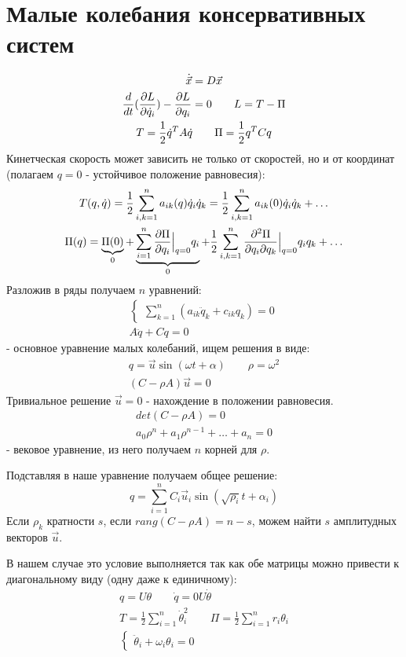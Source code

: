 \documentclass{article}
\begin{document}
\section{Малые колебания консервативных систем}
\begin{gather*}
  \dot{\vec{x}}=D\vec{x} \\ 
  \frac{d}{dt}(\frac{\partial{L}}{\partial{\dot{q}_i}})-\frac{\partial{L}}{\partial{q_i}}=0 \qquad L = T-\Pi \\ 
  T=\frac{1}{2}\dot{q}^{T}A\dot{q} \qquad \Pi=\frac{1}{2}q^{T}Cq
\end{gather*}
Кинетческая скорость может зависить не только от скоростей, но и от координат 
(полагаем $q=0$ - устойчивое положение равновесия):
\begin{gather*}
  T(q, \dot{q})=\frac{1}{2}\sum_{i,k=1}^{n}a_{ik}(q)\dot{q}_i\dot{q}_k
  = \frac{1}{2}\sum_{i,k=1}^{n}a_{ik}(0)\dot{q}_i\dot{q}_k + \dots \\ 
  \Pi(q) = \underbrace{\Pi(0)}_{0} + \underbrace{\sum_{i=1}^{n}\frac{\partial{\Pi}}{\partial{q_i}}\Big|_{q=0} q_i}_{0}
  + \frac{1}{2}\sum_{i,k=1}^{n}\frac{\partial^{2}\Pi}{\partial q_i \partial q_k}\Big|_{q=0} q_iq_k + \dots 
\end{gather*}
Разложив в ряды получаем $n$ уравнений:
\begin{gather*}
  \left\{\begin{aligned}
    \sum_{k=1}^{n}(a_{ik}\ddot q_k + c_{ik}q_k)=0
  \end{aligned}\right. \\ 
  A\ddot q + Cq=0
\end{gather*}
- основное уравнение малых колебаний, ищем решения в виде:
\begin{gather*}
  q=\vec{u}\sin (\omega t + \alpha) \qquad \rho=\omega^{2} \\ 
  (C-\rho A)\vec{u}=0
\end{gather*}
Тривиальное решение $\vec{u}=0$ - нахождение в положении равновесия.
\begin{gather*}
  det(C-\rho A)=0 \\ 
  a_0 \rho^{n}+a_1 \rho^{n-1} + \dots + a_n=0
\end{gather*}
- вековое уравнение, из него получаем $n$ корней для $\rho$.

Подставляя в наше уравнение получаем общее решение:
\[
  q=\sum_{i=1}^{n}C_i\vec{u}_i \sin (\sqrt{\rho_i}t+\alpha_i)
\]
Если $\rho_k$ кратности $s$, если $rang(C-\rho A)=n-s$,
можем найти $s$ амплитудных векторов $\vec{u}$.

В нашем случае это условие выполняется так как обе матрицы можно
привести к диагональному виду (одну даже к единичному):
\begin{gather*}
  q=U \theta \qquad \dot{q}=0U\dot{\theta} \\ 
  T=\frac{1}{2}\sum_{i=1}^{n}\dot{\theta}_i^{2} \qquad \Pi = \frac{1}{2}\sum_{i=1}^{n}r_i\theta_i \\ 
  \left\{\begin{aligned}
    \ddot \theta_i + \omega_i\theta_i=0
  \end{aligned}\right.
\end{gather*}
\end{document}
